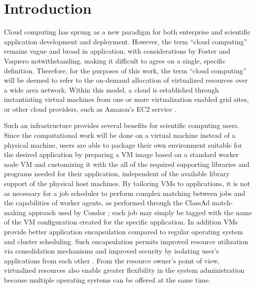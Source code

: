 \chapter{Introduction}
\label{chap:Introduction}

Cloud computing has sprung as a new paradigm for both enterprise and 
scientific application development and deployment. However, the term ``cloud
computing'' remains vague and broad in application, with considerations 
by Foster \cite{Foster2009} and Vaquero \cite{Vaquero2008} notwithstanding,
making it difficult to agree on a single, specific definition. Therefore, for
the purposes of this work, the term ``cloud computing'' will be deemed to
refer to the on-demand allocation of virtualized resources over a wide area
network. Within this model, a cloud is established through instantiating 
virtual machines from one or more virtualization enabled grid sites, or other
cloud providers, such as Amazon's EC2 service \cite{EC2}.

Such an infrastructure provides several benefits for scientific computing users.
Since the computational work will be done on a virtual machine instead of a
physical machine, users are able to package their own environment suitable for
the desired application by preparing a VM image based on a standard worker node
VM and customizing it with the all of the required supporting libraries and
programs needed for their application, independent of the available library
support of the physical host machines. By tailoring VMs to applications, it
is not as necessary for a job scheduler to perform complex matching between
jobs and the capabilities of worker agents, as performed through the ClassAd
match-making approach used by Condor \cite{Tannenbaum2001}; each job may simply
be tagged with the name of the VM configuration created for the specific
application. In addition VMs provide better application encapsulation compared
to regular operating system and cluster scheduling. Such encapsulation permits
improved resource utilization via consolidation mechanisms and improved security
by isolating user's applications from each other \cite{Figueiredo2003}. From
the resource owner's point of view, virtualized resources also enable greater
flexibility in the system administration because multiple operating systems can
be offered at the same time.

